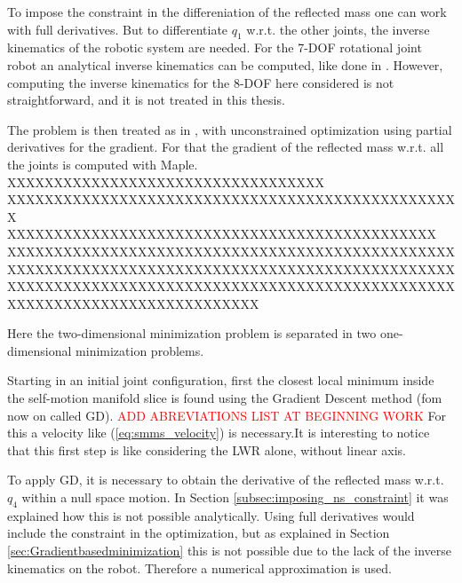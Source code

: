 To impose the constraint in the differeniation of the reflected mass one can work with full derivatives. But to differentiate $q_1$ w.r.t. the other joints, the inverse kinematics of the robotic system are needed. For the 7-DOF rotational joint robot an analytical inverse kinematics can be computed, like done in \cite{analyticalInverseKinematicComputation}. However, computing the inverse kinematics for the 8-DOF here considered is not straightforward, and it is not treated in this thesis.



The problem is then treated as in \cite{paper_iros2017}, with unconstrained optimization using partial derivatives for the gradient. For that the gradient of the reflected mass w.r.t. all the joints is computed with Maple.
XXXXXXXXXXXXXXXXXXXXXXXXXXXXXXXXXX  \\ XXXXXXXXXXXXXXXXXXXXXXXXXXXXXXXXXXXXXXXXXXXXXXXXX\\XXXXXXXXXXXXXXXXXXXXXXXXXXXXXXXXXXXXXXXXXXXXXX\\ XXXXXXXXXXXXXXXXXXXXXXXXXXXXXXXXXXXXXXXXXXXXXXXXXXXXXXXXXXXXXXXXXXXXXXXXXXXXXXXXXXXXXXXXXXXXXXXXXXXXXXXXXXXXXXXXXXXXXXXXXXXXXXXXXXXXXXXXXXXXXXXXXXXXXXXXXXXXXXXXXXXXXXXXXXX





Here the two-dimensional minimization problem is separated in two one-dimensional minimization problems.

 Starting in an initial joint configuration, first the closest local minimum inside the self-motion manifold slice is found using the Gradient Descent method (fom now on called GD). \textcolor{red}{ADD ABREVIATIONS LIST AT BEGINNING WORK } For this a velocity like (\ref{eq:smms_velocity}) is necessary.It is interesting to notice that this first step is like considering the LWR alone, without linear axis.


To apply GD, it is necessary to obtain the derivative of the reflected mass w.r.t. $q_4$ within a null space motion. In Section \ref{subsec:imposing_ns_constraint} it was explained how this is not possible analytically. Using full derivatives would include the constraint in the optimization, but as explained in Section \ref{sec:Gradientbasedminimization} this is not possible due to the lack of the inverse kinematics on the robot. Therefore a numerical approximation is used. 






